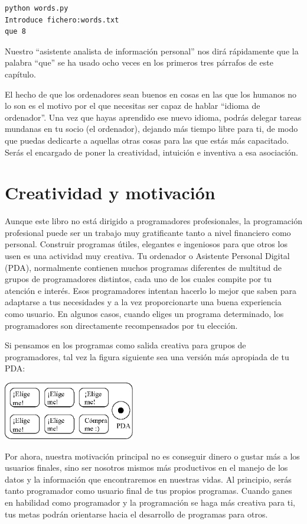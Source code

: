 \beforeverb
\begin{verbatim}
python words.py
Introduce fichero:words.txt
que 8
\end{verbatim}
\afterverb
%
Nuestro ``asistente analista de información personal'' nos dirá
rápidamente que la palabra ``que'' se ha usado ocho veces en los
primeros tres párrafos de este capítulo.

El hecho de que los ordenadores sean buenos en cosas
en las que los humanos no lo son es el motivo por el que necesitas
ser capaz de hablar ``idioma de ordenador''. Una vez que hayas
aprendido ese nuevo idioma, podrás delegar tareas mundanas
en tu socio (el ordenador), dejando más tiempo libre
para ti, de modo que puedas dedicarte a aquellas otras cosas
para las que estás más capacitado. Serás el encargado
de poner la creatividad, intuición e inventiva a esa
asociación.

\section{Creatividad y motivación}

Aunque este libro no está dirigido a programadores profesionales, la programación
profesional puede ser un trabajo muy gratificante tanto a nivel financiero como personal.
Construir programas útiles, elegantes e ingeniosos para que otros los usen
es una actividad muy creativa. Tu ordenador o Asistente Personal Digital (PDA),
normalmente contienen muchos programas diferentes de multitud de grupos de programadores
distintos, cada uno de los cuales compite por tu atención e interés.
Esos programadores intentan hacerlo lo mejor que saben para adaptarse a tus necesidades y
a la vez proporcionarte una buena experiencia como usuario. En algunos casos, cuando eliges un
programa determinado, los programadores son directamente recompensados por tu elección.

Si pensamos en los programas como salida creativa para grupos de programadores,
tal vez la figura siguiente sea una versión más apropiada de tu PDA:

\beforefig
\centerline{\includegraphics[height=1.00in]{figs2/pda2.eps}}
\afterfig

Por ahora, nuestra motivación principal no es conseguir dinero o gustar más a los usuarios
finales, sino ser nosotros mismos más productivos en el manejo de los datos y la
información que encontraremos en nuestras vidas.
Al principio, serás tanto programador como usuario final de tus propios programas.
Cuando ganes en habilidad como programador y la programación se haga más creativa para ti,
tus metas podrán orientarse hacia el desarrollo de programas para otros.

